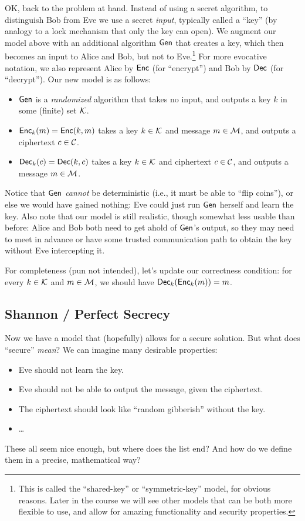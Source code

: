 \documentclass[11pt]{article}
\begin{document}
OK, back to the problem at hand.  Instead of using a secret algorithm,
to distinguish Bob from Eve we use a secret \emph{input}, typically
called a ``key'' (by analogy to a lock mechanism that only the key can
open).  We augment our model above with an additional algorithm
$\mathsf{Gen}$ that creates a key, which then becomes an input to Alice and
Bob, but not to Eve.\footnote{This is called the ``shared-key'' or
  ``symmetric-key'' model, for obvious reasons.  Later in the course
  we will see other models that can be both more flexible to use, and
  allow for amazing functionality and security properties.} For more
evocative notation, we also represent Alice by $\mathsf{Enc}$ (for
``encrypt'') and Bob by $\mathsf{Dec}$ (for ``decrypt'').  Our new model is
as follows:
\begin{itemize}
\item $\mathsf{Gen}$ is a \emph{randomized} algorithm that takes no input,
  and outputs a key $k$ in some (finite) set $\mathcal{K}$.
\item $\mathsf{Enc}_{k}(m) = \mathsf{Enc}(k,m)$ takes a key $k \in \mathcal{K}$
  and message $m \in \mathcal{M}$, and outputs a ciphertext $c \in
  \mathcal{C}$.
\item $\mathsf{Dec}_{k}(c) = \mathsf{Dec}(k,c)$ takes a key $k \in \mathcal{K}$
  and ciphertext $c \in \mathcal{C}$, and outputs a message $m \in
  \mathcal{M}$.
\end{itemize}
Notice that $\mathsf{Gen}$ \emph{cannot} be deterministic (i.e., it must be
able to ``flip coins''), or else we would have gained nothing: Eve
could just run $\mathsf{Gen}$ herself and learn the key.  Also note that
our model is still realistic, though somewhat less usable than before:
Alice and Bob both need to get ahold of $\mathsf{Gen}$'s output, so they
may need to meet in advance or have some trusted communication path to
obtain the key without Eve intercepting it.

For completeness (pun not intended), let's update our correctness
condition: for every $k \in \mathcal{K}$ and $m \in \mathcal{M}$, we
should have $\mathsf{Dec}_{k}(\mathsf{Enc}_{k}(m)) = m$.

\subsection{Shannon / Perfect Secrecy}
\label{sec:shannon-perfect-secrecy}

Now we have a model that (hopefully) allows for a secure solution.
But what does ``secure'' \emph{mean}?  We can imagine many desirable
properties:
\begin{itemize}
\item Eve should not learn the key.
\item Eve should not be able to output the message, given the
  ciphertext.
\item The ciphertext should look like ``random gibberish'' without the
  key.
\item \ldots
\end{itemize}
These all seem nice enough, but where does the list end?  And how do
we define them in a precise, mathematical way?
\end{document}
